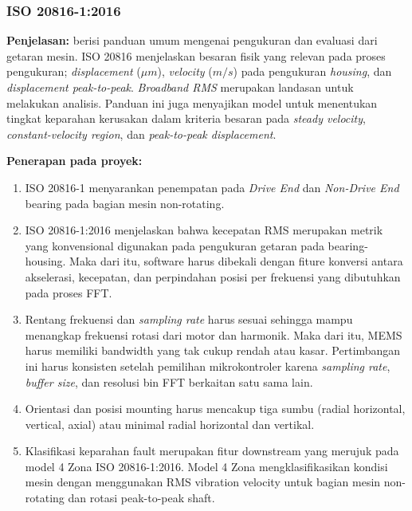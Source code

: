 \documentclass{elsinta}
\begin{document}
\subsubsection{ISO 20816-1:2016}
\textbf{Penjelasan:} 
\cite{2.1.3} berisi panduan umum mengenai pengukuran dan evaluasi dari getaran mesin. ISO 20816 menjelaskan besaran fisik yang relevan pada proses pengukuran; \textit{displacement} ($\mu m$),\textit{ velocity} ($m/s$) pada pengukuran \textit{housing}, dan \textit{displacement peak-to-peak}. \textit{Broadband RMS} merupakan landasan untuk melakukan analisis. Panduan ini juga menyajikan model untuk menentukan tingkat keparahan kerusakan dalam kriteria besaran pada \textit{steady velocity}, \textit{constant-velocity region}, dan \textit{peak-to-peak displacement}.

\textbf{Penerapan pada proyek:} 
\begin{enumerate}
    \item ISO 20816-1 menyarankan penempatan pada \textit{Drive End} dan \textit{Non-Drive End} bearing pada bagian mesin non-rotating.
    \item ISO 20816-1:2016 menjelaskan bahwa kecepatan RMS merupakan metrik yang konvensional digunakan pada pengukuran getaran pada bearing-housing. Maka dari itu, software harus dibekali dengan fiture konversi antara akselerasi, kecepatan, dan perpindahan posisi per frekuensi  yang dibutuhkan pada proses FFT.
    \item Rentang frekuensi dan \textit{sampling rate} harus sesuai sehingga mampu menangkap frekuensi rotasi dari motor dan harmonik. Maka dari itu, MEMS harus memiliki bandwidth yang tak cukup rendah atau kasar. Pertimbangan ini harus konsisten setelah pemilihan mikrokontroler karena \textit{sampling rate}, \textit{buffer size}, dan resolusi bin FFT berkaitan satu sama lain.
    \item Orientasi dan posisi mounting harus mencakup tiga sumbu (radial horizontal, vertical, axial) atau minimal radial horizontal dan vertikal.
    \item Klasifikasi keparahan fault merupakan fitur downstream yang merujuk pada model 4 Zona ISO 20816-1:2016. Model 4 Zona mengklasifikasikan kondisi mesin dengan menggunakan RMS vibration velocity untuk bagian mesin non-rotating dan rotasi peak-to-peak shaft.
\end{enumerate}
\end{document}
